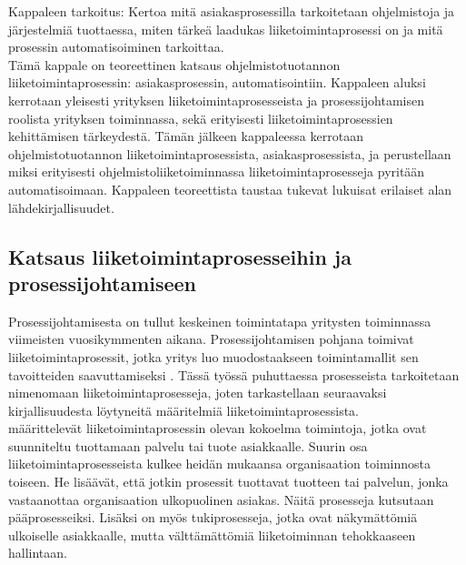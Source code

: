 \documentclass[finnish,12pt,a4paper,pdftex]{article}
\begin{document}

Kappaleen tarkoitus: Kertoa mitä asiakasprosessilla tarkoitetaan ohjelmistoja ja järjestelmiä tuottaessa, miten tärkeä laadukas liiketoimintaprosessi on ja mitä prosessin automatisoiminen tarkoittaa. \\

Tämä kappale on teoreettinen katsaus ohjelmistotuotannon liiketoimintaprosessin: asiakasprosessin, automatisointiin. Kappaleen aluksi kerrotaan yleisesti yrityksen liiketoimintaprosesseista ja prosessijohtamisen roolista yrityksen toiminnassa, sekä erityisesti liiketoimintaprosessien kehittämisen tärkeydestä. Tämän jälkeen kappaleessa kerrotaan ohjelmistotuotannon liiketoimintaprosessista, asiakasprosessista, ja perustellaan miksi erityisesti ohjelmistoliiketoiminnassa liiketoimintaprosesseja pyritään automatisoimaan. Kappaleen teoreettista taustaa tukevat lukuisat erilaiset alan lähdekirjallisuudet. 

\subsection{Katsaus liiketoimintaprosesseihin ja prosessijohtamiseen}

Prosessijohtamisesta on tullut keskeinen toimintatapa yritysten toiminnassa viimeisten vuosikymmenten aikana. Prosessijohtamisen pohjana toimivat liiketoimintaprosessit, jotka yritys luo muodostaakseen toimintamallit sen tavoitteiden saavuttamiseksi \citep{ohjelmistotuotanto}. Tässä työssä puhuttaessa prosesseista tarkoitetaan nimenomaan liiketoimintaprosesseja, joten tarkastellaan seuraavaksi kirjallisuudesta löytyneitä määritelmiä liiketoimintaprosessista.\\

\cite{rumbra} määrittelevät liiketoimintaprosessin olevan kokoelma toimintoja, jotka ovat suunniteltu tuottamaan palvelu tai tuote asiakkaalle. Suurin osa liiketoimintaprosesseista kulkee heidän mukaansa organisaation toiminnosta toiseen. He lisäävät, että jotkin prosessit tuottavat tuotteen tai palvelun, jonka vastaanottaa organisaation ulkopuolinen asiakas. Näitä prosesseja kutsutaan pääprosesseiksi. Lisäksi on myös tukiprosesseja, jotka ovat näkymättömiä ulkoiselle asiakkaalle, mutta välttämättömiä liiketoiminnan tehokkaaseen hallintaan.\\
\end{document}
